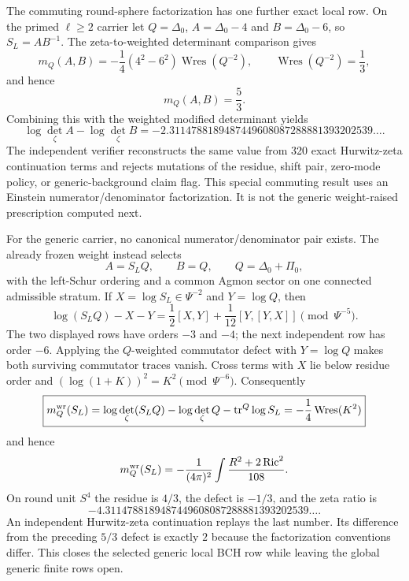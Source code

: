 \documentclass[11pt]{article}
\theoremstyle{definition}
\theoremstyle{remark}
\begin{document}
The commuting round-sphere factorization has one further exact local row.
On the primed $\ell\geq2$ carrier let
$Q=\Delta_0$, $A=\Delta_0-4$ and $B=\Delta_0-6$, so $S_L=AB^{-1}$.
The zeta-to-weighted determinant comparison gives
\[
 m_Q(A,B)=-\frac14(4^2-6^2)\operatorname{Wres}(Q^{-2}),
 \qquad
 \operatorname{Wres}(Q^{-2})=\frac13,
\]
and hence
\[
 m_Q(A,B)=\frac53.
\]
Combining this with the weighted modified determinant yields
\[
 \log\det_\zeta A-\log\det_\zeta B
 =-2.3114788189487449608087288881393202539\ldots.
\]
The independent verifier reconstructs the same value from 320 exact
Hurwitz-zeta continuation terms and rejects mutations of the residue, shift
pair, zero-mode policy, or generic-background claim flag.  This special
commuting result uses an Einstein numerator/denominator factorization.  It is
not the generic weight-raised prescription computed next.

For the generic carrier, no canonical numerator/denominator pair exists.
The already frozen weight instead selects
\[
 A=S_LQ,\qquad B=Q,\qquad Q=\Delta_0+\Pi_0,
\]
with the left-Schur ordering and a common Agmon sector on one connected
admissible stratum.  If $X=\log S_L\in\Psi^{-2}$ and $Y=\log Q$, then
\[
 \log(S_LQ)-X-Y
 =\frac12[X,Y]+\frac1{12}[Y,[Y,X]]\pmod{\Psi^{-5}}.
\]
The two displayed rows have orders $-3$ and $-4$; the next independent row
has order $-6$.  Applying the $Q$-weighted commutator defect with
$Y=\log Q$ makes both surviving commutator traces vanish.  Cross terms with
$X$ lie below residue order and $(\log(1+K))^2=K^2\pmod{\Psi^{-6}}$.
Consequently
\[
 \boxed{
 m_Q^{\rm wr}(S_L)
 =\log\det_\zeta(S_LQ)-\log\det_\zeta Q-\operatorname{tr}^Q\log S_L
 =-\frac14\operatorname{Wres}(K^2)}
\]
and hence
\[
 m_Q^{\rm wr}(S_L)
 =-\frac1{(4\pi)^2}\int
 \frac{R^2+2\operatorname{Ric}^2}{108}.
\]
On round unit $S^4$ the residue is $4/3$, the defect is $-1/3$, and the
zeta ratio is
\[
 -4.3114788189487449608087288881393202539\ldots .
\]
An independent Hurwitz-zeta continuation replays the last number.  Its
difference from the preceding $5/3$ defect is exactly $2$ because the
factorization conventions differ.  This closes the selected generic local
BCH row while leaving the global generic finite rows open.
\end{document}
